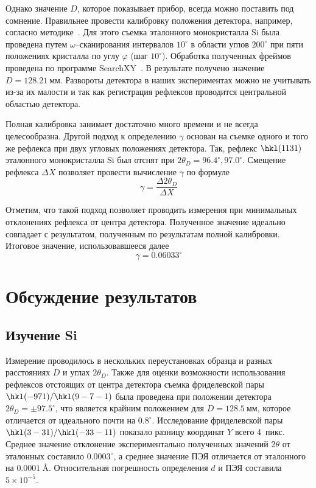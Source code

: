 \documentclass[a4paper,14pt]{extarticle}
\newcommand{\unit}[1]{ \ \text{#1}}
\newcommand{\degree}{^\circ}
\begin{document}
Однако значение $D$, которое показывает прибор, всегда можно поставить под сомнение.
Правильнее провести калибровку положения детектора, например, согласно методике~\cite{Panchenko:2023}.
Для этого съемка эталонного монокристалла Si была проведена путем $\omega$--сканирования интервалов $10\degree$ в области углов $200\degree$ при пяти положениях кристалла по углу $\varphi$ (шаг $10\degree$).
Обработка полученных фреймов проведена по программе SearchXY~\cite{Panchenko:2023}.
В результате получено значение $D = 128.21\unit{мм}$.
Развороты детектора в наших экспериментах можно не учитывать из-за их малости и так как регистрация рефлексов проводится центральной областью детектора.

Полная калибровка занимает достаточно много времени и не всегда целесообразна.
Другой подход к определению $\gamma$ основан на съемке одного и того же рефлекса при двух угловых положениях детектора.
Так, рефлекс $\hkl(11 3 1)$ эталонного монокристалла Si был отснят при $2\theta_D = 96.4\degree, 97.0\degree$.
Смещение рефлекса $\Delta X$ позволяет провести вычисление $\gamma$ по формуле
\begin{equation} \label{eq:gamma_delta}
    \gamma = \frac{\Delta 2\theta_D}{\Delta X}
\end{equation}

Отметим, что такой подход позволяет проводить измерения при минимальных отклонениях рефлекса от центра детектора.
Полученное значение идеально совпадает с результатом, полученным по результатам полной калибровки.
Итоговое значение, использовавшееся далее
\[ \gamma = 0.06033\degree \]
\section{Обсуждение результатов}
\subsection{Изучение Si}
Измерение проводилось в нескольких переустановках образца и разных расстояниях $D$ и углах $2\theta_D$.
Также для оценки возможности использования рефлексов отстоящих от центра детектора съемка фриделевской пары $\hkl(-9 7 1)/\hkl(9 -7 -1)$ была проведена при положении детектора $2\theta_D = \pm 97.5\degree$, что является крайним положением для $D = 128.5\unit{мм}$, которое отличается от идеального почти на $0.8\degree$.
Исследование фриделевской пары $\hkl(3 -3 1)/\hkl(-3 3 -11)$ показало разницу координат $Y$ всего 4~пикс.
Среднее значение отклонение экспериментально полученных значений $2\theta$ от эталонных составило $0.0003\degree$, а среднее значение ПЭЯ отличается от эталонного на $0.0001\unit{\AA}$.
Относительная погрешность определения $d$ и ПЭЯ составила $5 \times 10^{-5}$.
\end{document}
